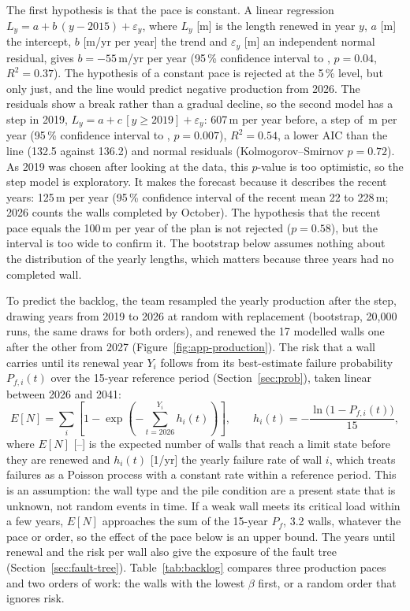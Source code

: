 The first hypothesis is that the pace is constant. A linear regression
$L_y = a + b\,(y - 2015) + \varepsilon_y$, where $L_y$ [m] is the length
renewed in year $y$, $a$ [m] the intercept, $b$ [m/yr per year] the trend and
$\varepsilon_y$ [m] an independent normal residual, gives $b = -55$\,m/yr per
year (95\,\% confidence interval  to , $p = 0.04$,
$R^2 = 0.37$). The hypothesis of a constant pace is rejected at the 5\,\%
level, but only just, and the line would predict negative production from
2026. The residuals show a break rather than a gradual decline, so the second
model has a step in 2019, $L_y = a + c\,[y \ge 2019] + \varepsilon_y$: 607\,m
per year before, a step of \,m per year (95\,\% confidence
interval  to , $p = 0.007$), $R^2 = 0.54$, a lower
AIC than the line (132.5 against 136.2) and normal residuals (Kolmogorov--Smirnov
$p = 0.72$). As 2019 was chosen after looking at the data, this $p$-value is
too optimistic, so the step model is exploratory. It makes the forecast
because it describes the recent years: 125\,m per year (95\,\% confidence
interval of the recent mean 22 to 228\,m; 2026 counts the walls completed by
October). The hypothesis that the recent pace equals the 100\,m per year of
the plan is not rejected ($p = 0.58$), but the interval is too wide to confirm
it. The bootstrap below assumes nothing about the
distribution of the yearly lengths, which matters because three years had no completed wall.

To predict the backlog, the team resampled the yearly production after the
step, drawing years from 2019 to 2026 at random with replacement (bootstrap, 20{,}000 runs, the same draws for both orders), and renewed the 17 modelled walls one after
the other from 2027 (Figure~\ref{fig:app-production}). The risk that a wall carries until its renewal year $Y_i$
follows from its best-estimate failure probability $P_{f,i}(t)$ over the
15-year reference period (Section~\ref{sec:prob}), taken linear between 2026
and 2041:
\begin{equation}
E[N] = \sum_{i} \left[1 - \exp\!\left(-\sum_{t=2026}^{Y_i} h_i(t)\right)\right],
\qquad h_i(t) = -\frac{\ln\bigl(1 - P_{f,i}(t)\bigr)}{15}, \label{eq:exposure}
\end{equation}
where $E[N]$ [--] is the expected number of walls that reach a limit state
before they are renewed and $h_i(t)$ [1/yr] the yearly failure rate of wall $i$,
which treats failures as a Poisson process with a constant rate within a
reference period. This is an assumption: the wall type and the pile condition are a
present state that is unknown, not random events in time. If a weak wall meets
its critical load within a few years, $E[N]$ approaches the sum of the 15-year
$P_f$, 3.2 walls, whatever the pace or order, so the effect of the pace below is
an upper bound. The years until renewal and the risk per wall also give the exposure of
the fault tree (Section~\ref{sec:fault-tree}). Table~\ref{tab:backlog} compares
three production paces and two orders of work: the walls with the lowest
$\beta$ first, or a random order that ignores risk.

